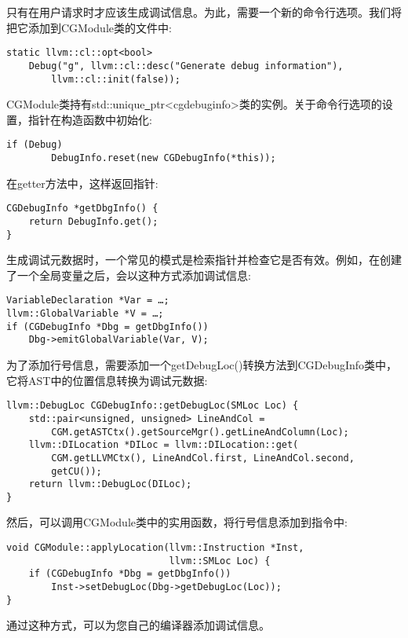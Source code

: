 只有在用户请求时才应该生成调试信息。为此，需要一个新的命令行选项。我们将把它添加到CGModule类的文件中:\par

\begin{lstlisting}[caption={}]
static llvm::cl::opt<bool>
	Debug("g", llvm::cl::desc("Generate debug information"),
		llvm::cl::init(false));
\end{lstlisting}

CGModule类持有std::unique\underline{~}ptr<cgdebuginfo>类的实例。关于命令行选项的设置，指针在构造函数中初始化:\par

\begin{lstlisting}[caption={}]
	if (Debug)
		DebugInfo.reset(new CGDebugInfo(*this));
\end{lstlisting}

在getter方法中，这样返回指针:\par

\begin{lstlisting}[caption={}]
CGDebugInfo *getDbgInfo() {
	return DebugInfo.get();
}
\end{lstlisting}

生成调试元数据时，一个常见的模式是检索指针并检查它是否有效。例如，在创建了一个全局变量之后，会以这种方式添加调试信息:\par

\begin{lstlisting}[caption={}]
VariableDeclaration *Var = …;
llvm::GlobalVariable *V = …;
if (CGDebugInfo *Dbg = getDbgInfo())
	Dbg->emitGlobalVariable(Var, V);
\end{lstlisting}

为了添加行号信息，需要添加一个getDebugLoc()转换方法到CGDebugInfo类中，它将AST中的位置信息转换为调试元数据:\par

\begin{lstlisting}[caption={}]
llvm::DebugLoc CGDebugInfo::getDebugLoc(SMLoc Loc) {
	std::pair<unsigned, unsigned> LineAndCol =
		CGM.getASTCtx().getSourceMgr().getLineAndColumn(Loc);
	llvm::DILocation *DILoc = llvm::DILocation::get(
		CGM.getLLVMCtx(), LineAndCol.first, LineAndCol.second,
		getCU());
	return llvm::DebugLoc(DILoc);
}
\end{lstlisting}

然后，可以调用CGModule类中的实用函数，将行号信息添加到指令中:\par

\begin{lstlisting}[caption={}]
void CGModule::applyLocation(llvm::Instruction *Inst,
							 llvm::SMLoc Loc) {
	if (CGDebugInfo *Dbg = getDbgInfo())
		Inst->setDebugLoc(Dbg->getDebugLoc(Loc));
}
\end{lstlisting}

通过这种方式，可以为您自己的编译器添加调试信息。\par
